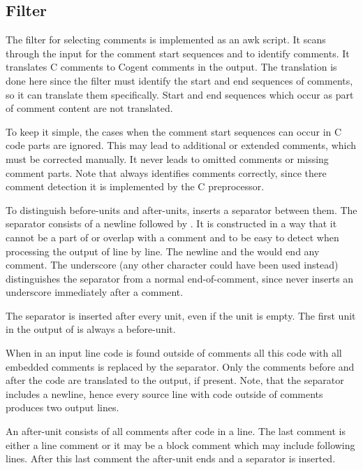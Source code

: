 \subsection{Filter }

The filter for selecting comments is implemented as an awk script. It scans through the input for the comment start
sequences \code{/*} and \code{//} to identify comments. It translates C comments to Cogent comments in the output.
The translation is done here since the filter must identify the start and end sequences of comments, so it can 
translate them specifically. Start and end sequences which occur as part of comment content are not translated.

To keep it simple, the cases when the comment start sequences can occur in C code parts are ignored. This may lead to
additional or extended comments, which must be corrected manually. It never leads to omitted comments or missing 
comment parts. Note that  always identifies comments correctly, since there comment detection
it is implemented by the C preprocessor.

To distinguish before-units and after-units,  inserts a separator between them. The separator
consists of a newline followed by \code{-\}\_}. It is constructed in a way that it cannot be a part of or overlap with a 
comment and to be easy to detect when processing the output of  line by line. The newline and
the \code{-\}} would end any comment. The underscore (any other character could have been used instead) distinguishes the
separator from a normal end-of-comment, since  never inserts an underscore immediately after a comment. 

The separator is inserted after every unit, even if the unit is empty. The first unit in the output of 
is always a before-unit.

When in an input line code is found outside of comments all this code with all embedded comments is replaced by the
separator. Only the comments before and after the code are translated to the output, if present.
Note, that the separator includes a newline, hence every source line with code outside of
comments produces two output lines. 

An after-unit consists of all comments after code in a line. The last comment is either a line comment or
it may be a block comment which may include following lines. After this last comment the after-unit ends and
a separator is inserted.

